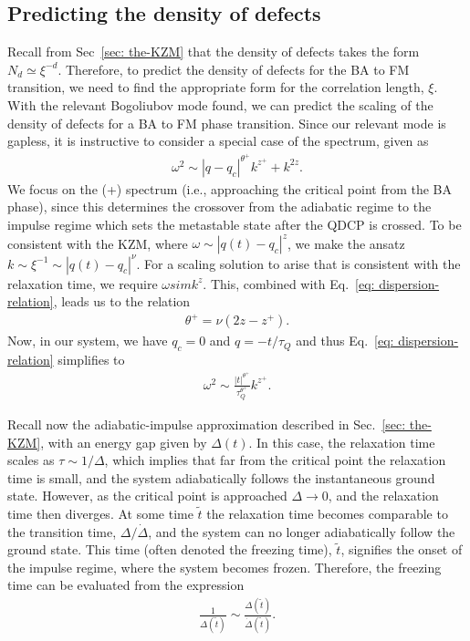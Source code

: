 \subsection{Predicting the density of defects}
Recall from Sec~\ref{sec: the-KZM} that the density of defects takes the form
\(N_d \simeq \xi^{-d}\).
Therefore, to predict the density of defects for the BA to FM transition, we
need to find the appropriate form for the correlation length, \(\xi \).
With the relevant Bogoliubov mode found, we can predict the scaling of the
density of defects for a BA to FM phase transition.
Since our relevant mode is gapless, it is instructive to consider a special case
of the spectrum, given as
\begin{align}\label{eq: dispersion-relation}
    \omega^2 \sim |q-q_c|^{\theta^+}k^{z^+}+k^{2z}.
\end{align}
We focus on the (+) spectrum (i.e., approaching the critical point from the BA
phase), since this determines the crossover from the adiabatic regime to the
impulse regime which sets the metastable state after the QDCP is crossed.
To be consistent with the KZM, where \(\omega \sim |q(t)-q_c|^{z}\), we make
the ansatz \(k \sim \xi^{-1} \sim |q(t)-q_c|^{\nu}\).
For a scaling solution to arise that is consistent with the relaxation time,
we require \(\omega sim k^z\).
This, combined with Eq.~\eqref{eq: dispersion-relation}, leads us to the
relation
\begin{align}
    \theta^+ = \nu (2z-z^+).
\end{align}
Now, in our system, we have \(q_c = 0\) and \(q = -t/\tau_Q\) and thus
Eq.~\eqref{eq: dispersion-relation} simplifies to
\begin{align}\label{eq: dispersion-relation-simplified}
    \omega^2 \sim \frac{|t|^{\theta^+}}{\tau_Q^{\theta^+}}k^{z^+}.    
\end{align}

Recall now the adiabatic-impulse approximation described in
Sec.~\ref{sec: the-KZM}, with an energy gap given by \(\Delta(t)\).
In this case, the relaxation time scales as \(\tau \sim 1/\Delta \), which
implies that far from the critical point the relaxation time is small, and the
system adiabatically follows the instantaneous ground state.
However, as the critical point is approached \(\Delta \rightarrow 0\), and the
relaxation time then diverges.
At some time \(\tilde{t}\) the relaxation time becomes comparable to the
transition time, \(\Delta / \dot{\Delta}\), and the system can no longer
adiabatically follow the ground state.
This time (often denoted the freezing time), \(\tilde{t}\), signifies the onset
of the impulse regime, where the system becomes frozen.
Therefore, the freezing time can be evaluated from the expression
\begin{align}
    \frac{1}{\Delta(\tilde{t})} \sim
    \frac{\Delta(\tilde{t})}{\dot{\Delta}(\tilde{t})} .
\end{align}

